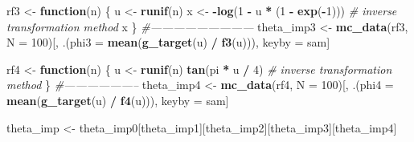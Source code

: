 \documentclass[]{book}
\newenvironment{Shaded}{\begin{snugshade}}{\end{snugshade}}
\newcommand{\CommentTok}[1]{\textcolor[rgb]{0.56,0.35,0.01}{\textit{#1}}}
\newcommand{\ControlFlowTok}[1]{\textcolor[rgb]{0.13,0.29,0.53}{\textbf{#1}}}
\newcommand{\DataTypeTok}[1]{\textcolor[rgb]{0.13,0.29,0.53}{#1}}
\newcommand{\DecValTok}[1]{\textcolor[rgb]{0.00,0.00,0.81}{#1}}
\newcommand{\KeywordTok}[1]{\textcolor[rgb]{0.13,0.29,0.53}{\textbf{#1}}}
\newcommand{\NormalTok}[1]{#1}
\newcommand{\OperatorTok}[1]{\textcolor[rgb]{0.81,0.36,0.00}{\textbf{#1}}}
\newcommand{\StringTok}[1]{\textcolor[rgb]{0.31,0.60,0.02}{#1}}
\theoremstyle{definition}
\theoremstyle{definition}
\theoremstyle{definition}
\theoremstyle{remark}
\begin{document}
\begin{Shaded}
\begin{Highlighting}[]
\NormalTok{rf3 <-}\StringTok{ }\ControlFlowTok{function}\NormalTok{(n) \{}
\NormalTok{  u <-}\StringTok{ }\KeywordTok{runif}\NormalTok{(n)}
\NormalTok{  x <-}\StringTok{ }\OperatorTok{-}\KeywordTok{log}\NormalTok{(}\DecValTok{1} \OperatorTok{-}\StringTok{ }\NormalTok{u }\OperatorTok{*}\StringTok{ }\NormalTok{(}\DecValTok{1} \OperatorTok{-}\StringTok{ }\KeywordTok{exp}\NormalTok{(}\OperatorTok{-}\DecValTok{1}\NormalTok{))) }\CommentTok{# inverse transformation method}
\NormalTok{  x}
\NormalTok{\}}
\CommentTok{#---------------------------}
\NormalTok{theta_imp3 <-}
\StringTok{  }\KeywordTok{mc_data}\NormalTok{(rf3, }\DataTypeTok{N =} \DecValTok{100}\NormalTok{)[,}
\NormalTok{                        .(}\DataTypeTok{phi3 =} \KeywordTok{mean}\NormalTok{(}\KeywordTok{g_target}\NormalTok{(u) }\OperatorTok{/}\StringTok{ }\KeywordTok{f3}\NormalTok{(u))),}
\NormalTok{                        keyby =}\StringTok{ }\NormalTok{sam]}
\end{Highlighting}
\end{Shaded}

\begin{Shaded}
\begin{Highlighting}[]
\NormalTok{rf4 <-}\StringTok{ }\ControlFlowTok{function}\NormalTok{(n) \{}
\NormalTok{  u <-}\StringTok{ }\KeywordTok{runif}\NormalTok{(n)}
  \KeywordTok{tan}\NormalTok{(pi }\OperatorTok{*}\StringTok{ }\NormalTok{u }\OperatorTok{/}\StringTok{ }\DecValTok{4}\NormalTok{) }\CommentTok{# inverse transformation method}
\NormalTok{\}}
\CommentTok{#--------------------}
\NormalTok{theta_imp4 <-}
\StringTok{  }\KeywordTok{mc_data}\NormalTok{(rf4, }\DataTypeTok{N =} \DecValTok{100}\NormalTok{)[,}
\NormalTok{                        .(}\DataTypeTok{phi4 =} \KeywordTok{mean}\NormalTok{(}\KeywordTok{g_target}\NormalTok{(u) }\OperatorTok{/}\StringTok{ }\KeywordTok{f4}\NormalTok{(u))),}
\NormalTok{                        keyby =}\StringTok{ }\NormalTok{sam]}
\end{Highlighting}
\end{Shaded}

\begin{Shaded}
\begin{Highlighting}[]
\NormalTok{theta_imp <-}\StringTok{ }\NormalTok{theta_imp0[theta_imp1][theta_imp2][theta_imp3][theta_imp4]}
\end{Highlighting}
\end{Shaded}
\end{document}
